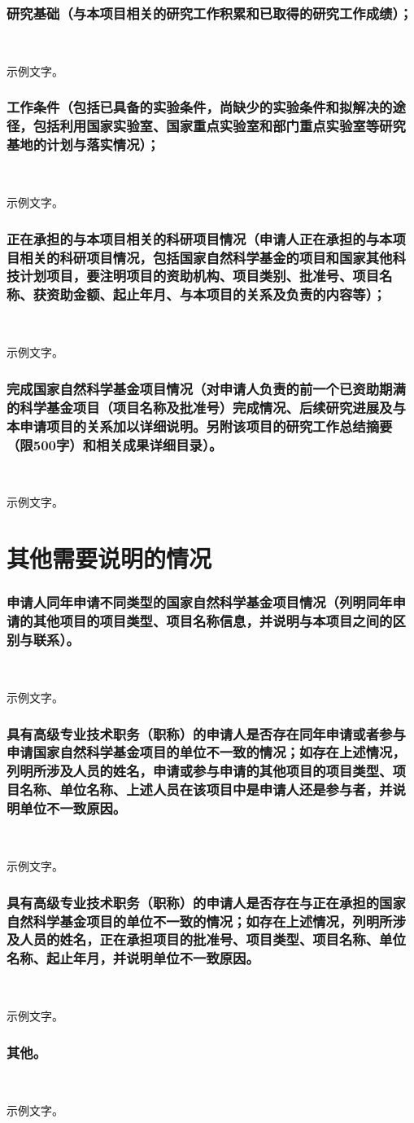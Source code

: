 \documentclass[12pt,a4paper]{article}
\begin{document}
\section{\textbf{研究基础}（与本项目相关的研究工作积累和已取得的研究工作成绩）；}\

示例文字。

\section{\textbf{工作条件}（包括已具备的实验条件，尚缺少的实验条件和拟解决的途径，包括利用国家实验室、国家重点实验室和部门重点实验室等研究基地的计划与落实情况）；}\

示例文字。

\section{\textbf{正在承担的与本项目相关的科研项目情况}（申请人正在承担的与本项目相关的科研项目情况，包括国家自然科学基金的项目和国家其他科技计划项目，要注明项目的资助机构、项目类别、批准号、项目名称、获资助金额、起止年月、与本项目的关系及负责的内容等）；}\

示例文字。

\section{\textbf{完成国家自然科学基金项目情况}（对申请人负责的前一个已资助期满的科学基金项目（项目名称及批准号）完成情况、后续研究进展及与本申请项目的关系加以详细说明。另附该项目的研究工作总结摘要（限500字）和相关成果详细目录）。}\

示例文字。

\part{\textbf{其他需要说明的情况}}
\section{申请人同年申请不同类型的国家自然科学基金项目情况（列明同年申请的其他项目的项目类型、项目名称信息，并说明与本项目之间的区别与联系）。}\

示例文字。

\section{具有高级专业技术职务（职称）的申请人是否存在同年申请或者参与申请国家自然科学基金项目的单位不一致的情况；如存在上述情况，列明所涉及人员的姓名，申请或参与申请的其他项目的项目类型、项目名称、单位名称、上述人员在该项目中是申请人还是参与者，并说明单位不一致原因。}\

示例文字。

\section{具有高级专业技术职务（职称）的申请人是否存在与正在承担的国家自然科学基金项目的单位不一致的情况；如存在上述情况，列明所涉及人员的姓名，正在承担项目的批准号、项目类型、项目名称、单位名称、起止年月，并说明单位不一致原因。}\

示例文字。

\section{其他。}\

示例文字。
\end{document}
